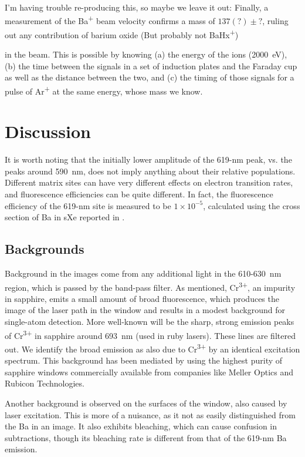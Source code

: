 \documentclass[aps,pra,reprint,superscriptaddress]{revtex4-1}
\begin{document}
{\color{red}I'm having trouble re-producing this, so maybe we leave it out:  }{\color{gray}Finally, a measurement of the Ba\textsuperscript{+} beam velocity confirms a mass of $137(?) \pm ?$, ruling out any contribution of barium oxide }(But probably not BaHx\textsuperscript{+}){{\color{gray}in the beam.  This is possible by knowing (a) the energy of the ions (2000~eV), (b) the time between the signals in a set of induction plates and the Faraday cup as well as the distance between the two, and (c) the timing of those signals for a pulse of Ar\textsuperscript{+} at the same energy, whose mass we know.  }

\section{Discussion}

It is worth noting that the initially lower amplitude of the 619-nm peak, vs. the peaks around 590~nm, does not imply anything about their relative populations.  Different matrix sites can have very different effects on electron transition rates, and fluorescence efficiencies can be quite different.  In fact, the fluorescence efficiency of the 619-nm site is measured to be {\color{red}$1\times10^{-5}$}, calculated using the cross section of Ba in sXe reported in \cite{Mong2015}.

\subsection{Backgrounds}
\label{sec:backgrounds}

Background in the images come from any additional light in the 610-630~nm region, which is passed by the band-pass filter.  As mentioned, Cr\textsuperscript{3+}, an impurity in sapphire, emits a small amount of broad fluorescence, which produces the image of the laser path in the window and results in a modest background for single-atom detection.  More well-known will be the sharp, strong emission peaks of Cr\textsuperscript{3+} in sapphire around 693~nm (used in ruby lasers).  These lines are filtered out.  We identify the broad emission as also due to Cr\textsuperscript{3+} by an identical excitation spectrum.  This background has been mediated by using the highest purity of sapphire windows commercially available from companies like Meller Optics and Rubicon Technologies.

Another background is observed on the surfaces of the window, also caused by laser excitation.  This is more of a nuisance, as it not as easily distinguished from the Ba in an image.  It also exhibits bleaching, which can cause confusion in subtractions, though its bleaching rate is different from that of the 619-nm Ba emission.  

}
\end{document}
